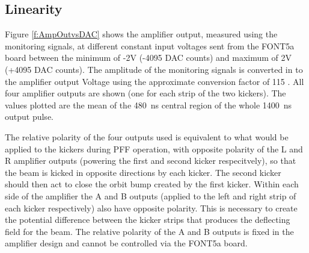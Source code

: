 
\subsection{Linearity}
\label{ss:ampLin}

Figure \ref{f:AmpOutvsDAC} shows the amplifier output, measured using the monitoring signals, at different constant input voltages sent from the FONT5a board between the minimum of -2V (-4095 DAC counts) and maximum of 2V (+4095 DAC counts). The amplitude of the monitoring signals is converted in to the amplifier output Voltage using the approximate conversion factor of 115 \cite{colinPriv}. All four amplifier outputs are shown (one for each strip of the two kickers). The values plotted are the mean of the 480~ns central region of the whole 1400~ns output pulse.

The relative polarity of the four outputs used is equivalent to what would be applied to the kickers during PFF operation, with opposite polarity of the L and R amplifier outputs (powering the first and second kicker respecitvely), so that the beam is kicked in opposite directions by each kicker. The second kicker should then act to close the orbit bump created by the first kicker. Within each side of the amplifier the A and B outputs (applied to the left and right strip of each kicker respectively) also have opposite polarity. This is necessary to create the potential difference between the kicker strips that produces the deflecting field for the beam. The relative polarity of the A and B outputs is fixed in the amplifier design and cannot be controlled via the FONT5a board.


